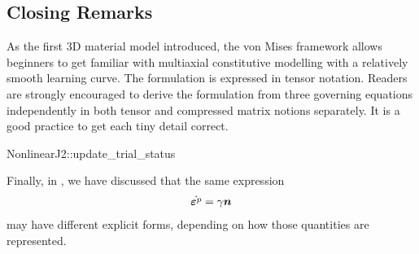 \subsection{Closing Remarks}
As the first 3D material model introduced, the von Mises framework allows beginners to get familiar with multiaxial constitutive modelling with a relatively smooth learning curve. The formulation is expressed in tensor notation. Readers are strongly encouraged to derive the formulation from three governing equations independently in both tensor and compressed matrix notions separately. It is a good practice to get each tiny detail correct.
\begin{cppcode}
    NonlinearJ2::update_trial_status
\end{cppcode}

Finally, in , we have discussed that the same expression
\begin{gather}
    \dot{\bm{\varepsilon}^p}=\gamma\bm{n}
\end{gather}
may have different explicit forms, depending on how those quantities are represented.


